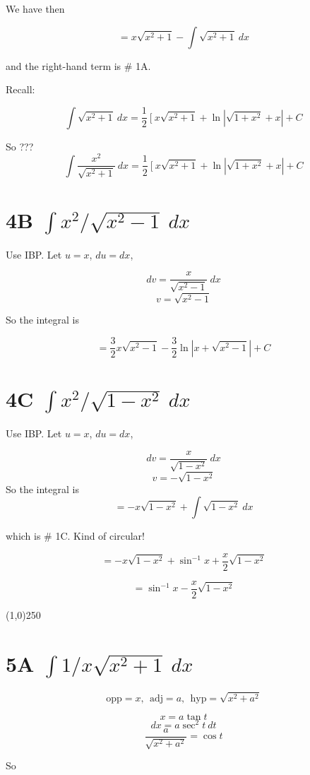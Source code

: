 \documentclass[11pt, oneside]{article}
\begin{document}
We have then

\[ = x \sqrt{x^2 + 1} - \int \sqrt{x^2 + 1} \ dx \]

and the right-hand term is \# 1A.

Recall:

\[ \int \sqrt{x^2 + 1} \ dx = \frac{1}{2} \ [ \ x \sqrt{x^2 + 1} + \ln |\sqrt{1+x^2} + x| + C \] 

So
???
\[ \int \frac{x^2}{\sqrt{x^2 + 1}} \ dx = \frac{1}{2} \ [ \ x \sqrt{x^2 + 1} + \ln |\sqrt{1+x^2} + x| + C \]

\section*{4B $\int x^2/\sqrt{x^2 - 1} \ dx$}

Use IBP.  Let $u=x$, $du=dx$, 

\[ dv = \frac{x}{\sqrt{x^2-1}} \ dx \]
\[ v = \sqrt{x^2-1} \]

So the integral is

\[ = \frac{3}{2} x \sqrt{x^2-1} - \frac{3}{2} \ln |x + \sqrt{x^2-1}| + C \]

\section*{4C $\int x^2/\sqrt{1 - x^2} \ dx$}

Use IBP.  Let $u=x$, $du=dx$, 

\[ dv = \frac{x}{\sqrt{1-x^2}} \ dx \]
\[ v = - \sqrt{1-x^2} \]
So the integral is
\[ = - x \sqrt{1-x^2} + \int \sqrt{1-x^2} \ dx \]

which is \# 1C.  Kind of circular!

\[ = - x \sqrt{1-x^2} + \sin^{-1} x + \frac{x}{2} \sqrt{1-x^2} \]

\[ = \sin^{-1} x - \frac{x}{2} \sqrt{1-x^2} \]

\begin{center} \line(1,0){250} \end{center}

\section*{5A $\int 1/x \sqrt{x^2 + 1} \ dx$ }

\[ \text{opp} = x, \ \ \text{adj} = a, \ \ \text{hyp} = \sqrt{x^2 + a^2}   \]

\[ x = a \tan t \]
\[ dx = a \sec^2 t \ dt \]
\[ \frac{a}{\sqrt{x^2 + a^2} } = \cos t \]

So
\end{document}
